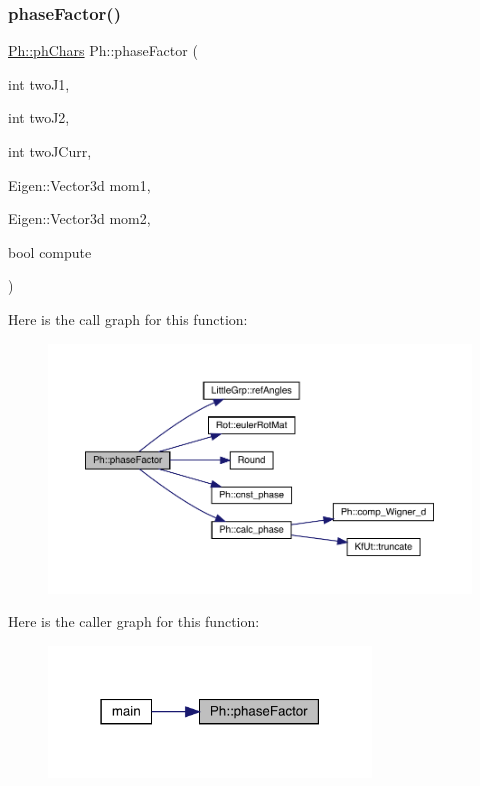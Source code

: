\subsubsection{\texorpdfstring{phaseFactor()}{phaseFactor()}}
{\footnotesize\ttfamily \mbox{\hyperlink{structPh_1_1phChars}{Ph\+::ph\+Chars}} Ph\+::phase\+Factor (\begin{DoxyParamCaption}\item[{int}]{two\+J1,  }\item[{int}]{two\+J2,  }\item[{int}]{two\+J\+Curr,  }\item[{Eigen\+::\+Vector3d}]{mom1,  }\item[{Eigen\+::\+Vector3d}]{mom2,  }\item[{bool}]{compute }\end{DoxyParamCaption})}

Here is the call graph for this function\+:
\nopagebreak
\begin{figure}[H]
\begin{center}
\leavevmode
\includegraphics[width=350pt]{d6/d3c/namespacePh_ad2fd8f885053b0833441c8388a9218b8_cgraph}
\end{center}
\end{figure}
Here is the caller graph for this function\+:
\nopagebreak
\begin{figure}[H]
\begin{center}
\leavevmode
\includegraphics[width=243pt]{d6/d3c/namespacePh_ad2fd8f885053b0833441c8388a9218b8_icgraph}
\end{center}
\end{figure}
